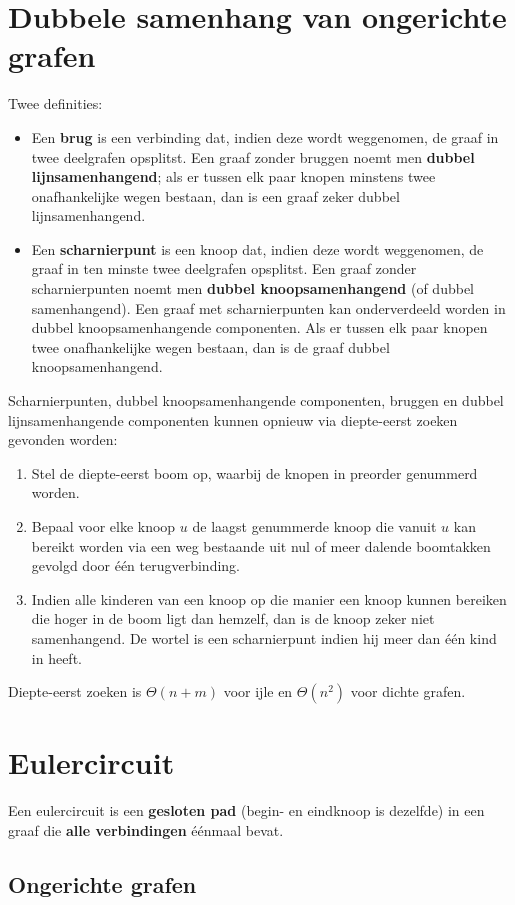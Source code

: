 \section{Dubbele samenhang van ongerichte grafen}
Twee definities:
\begin{itemize}
	\item Een \textbf{brug} is een verbinding dat, indien deze wordt weggenomen, de graaf in twee deelgrafen opsplitst. Een graaf zonder bruggen noemt men \textbf{dubbel lijnsamenhangend}; als er tussen elk paar knopen minstens twee onafhankelijke wegen bestaan, dan is een graaf zeker dubbel lijnsamenhangend.
	\item Een \textbf{scharnierpunt}  is een knoop dat, indien deze wordt weggenomen, de graaf in ten minste twee deelgrafen opsplitst. Een graaf zonder scharnierpunten noemt men \textbf{dubbel knoopsamenhangend} (of dubbel samenhangend). Een graaf met scharnierpunten kan onderverdeeld worden in dubbel knoopsamenhangende componenten. Als er tussen elk paar knopen twee onafhankelijke wegen bestaan, dan is de graaf dubbel knoopsamenhangend.
\end{itemize}

Scharnierpunten, dubbel knoopsamenhangende componenten, bruggen en dubbel lijnsamenhangende componenten kunnen opnieuw via diepte-eerst zoeken gevonden worden:
\begin{enumerate}
	\item Stel de diepte-eerst boom op, waarbij de knopen in preorder genummerd worden. 
	\item Bepaal voor elke knoop $u$ de laagst genummerde knoop die vanuit $u$ kan bereikt worden via een weg bestaande uit nul of meer dalende boomtakken gevolgd door één terugverbinding. 
	\item Indien alle kinderen van een knoop op die manier een knoop kunnen bereiken die hoger in de boom ligt dan hemzelf, dan is de knoop zeker niet samenhangend. De wortel is een scharnierpunt indien hij meer dan één kind in heeft. 
\end{enumerate}
Diepte-eerst zoeken is $\Theta(n + m)$ voor ijle en $\Theta(n^2)$ voor dichte grafen.
\section{Eulercircuit}
Een eulercircuit is een \textbf{gesloten pad} (begin- en eindknoop is dezelfde) in een graaf die \textbf{alle verbindingen} éénmaal bevat. 
\subsection{Ongerichte grafen}

